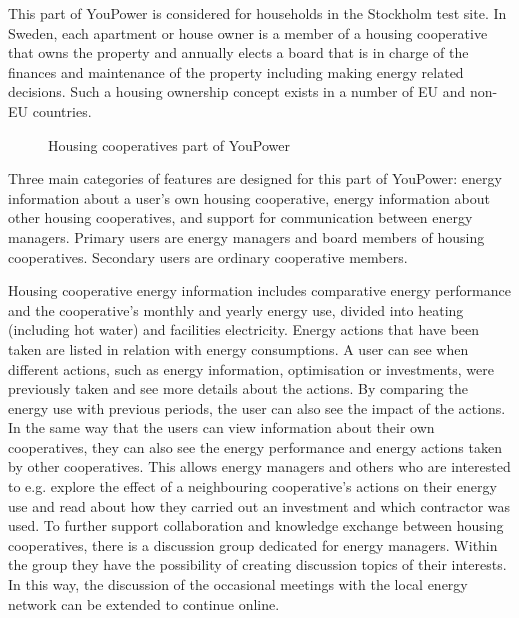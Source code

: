 This part of YouPower is considered for households in the Stockholm test site. In Sweden, each apartment or house owner is a member of a housing cooperative that owns the property and annually elects a board that is in charge of the finances and maintenance of the property including making energy related decisions. 
Such a housing ownership concept exists in a number of EU and non-EU countries.

\begin{figure}[t!]
\centering
\caption{Housing cooperatives part of YouPower}
\label{fig:brf}
\end{figure}


% 
Three main categories of features are designed for this part of YouPower: energy information about a user's own housing cooperative, energy information about other housing cooperatives, and support for communication between energy managers.
Primary users are energy managers and board members of housing cooperatives. Secondary users are ordinary cooperative members. 

Housing cooperative energy information includes comparative energy performance %
and the cooperative's monthly and yearly energy use, divided into heating (including hot water) and facilities electricity. Energy actions that have been taken are listed in relation with energy consumptions. 
A user can see when different actions, such as energy information, optimisation or investments, were previously taken and see more details about the actions. By comparing the energy use with previous periods, the user can also see the impact of the actions.
% 
In the same way that the users can view information about their own cooperatives, they can also see the energy performance and energy actions taken by other cooperatives. This allows energy managers and others who are interested to e.g. explore the effect of a neighbouring cooperative's actions on their energy use and read about how they carried out an investment and which contractor was used. 
% 
To further support collaboration and knowledge exchange between housing cooperatives, there is a discussion group dedicated for energy managers. Within the group they have the possibility of creating discussion topics of their interests. In this way, the discussion of the occasional meetings with the local energy network can be extended to continue online.

